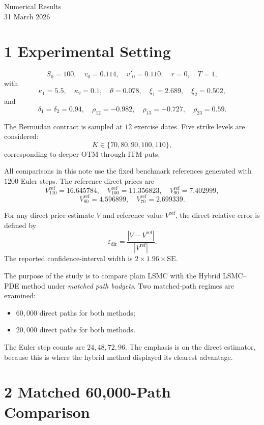 \documentclass[11pt,a4paper]{article}
\begin{document}
\begin{center}
{\Large Numerical Results}\\[0.5em]
{\normalsize 31 March 2026}
\end{center}

\section*{1 \quad Experimental Setting}

\[
S_0 = 100,\quad v_0 = 0.114,\quad v'_0 = 0.110,\quad r = 0,\quad T = 1,
\]
with
\[
\kappa_1 = 5.5,\quad \kappa_2 = 0.1,\quad \theta = 0.078,\quad \xi_1 = 2.689,\quad \xi_2 = 0.502,
\]
and
\[
\delta_1 = \delta_2 = 0.94,\quad \rho_{12} = -0.982,\quad \rho_{13} = -0.727,\quad \rho_{23} = 0.59.
\]

The Bermudan contract is sampled at \(12\) exercise dates. Five strike levels are considered:
\[
K \in \{70,80,90,100,110\},
\]
corresponding to deeper OTM through ITM puts.

All comparisons in this note use the fixed benchmark references generated with \(1200\) Euler steps. The reference direct prices are
\[
V^{\mathrm{ref}}_{110} = 16.645784,\quad V^{\mathrm{ref}}_{100} = 11.356823,\quad V^{\mathrm{ref}}_{90} = 7.402999,
\]
\[
V^{\mathrm{ref}}_{80} = 4.596899,\quad V^{\mathrm{ref}}_{70} = 2.699339.
\]

For any direct price estimate \(V\) and reference value \(V^{\mathrm{ref}}\), the direct relative error is defined by
\[
\varepsilon_{\mathrm{dir}} = \frac{|V - V^{\mathrm{ref}}|}{|V^{\mathrm{ref}}|}.
\]
The reported confidence-interval width is \(2 \times 1.96 \times \mathrm{SE}\).

The purpose of the study is to compare plain LSMC with the Hybrid LSMC--PDE method under \emph{matched path budgets}. Two matched-path regimes are examined:
\begin{itemize}
\item \(60{,}000\) direct paths for both methods;
\item \(20{,}000\) direct paths for both methods.
\end{itemize}

The Euler step counts are \(24,48,72,96\). The emphasis is on the direct estimator, because this is where the hybrid method displayed its clearest advantage.

\section*{2 \quad Matched 60,000-Path Comparison}
\end{document}
